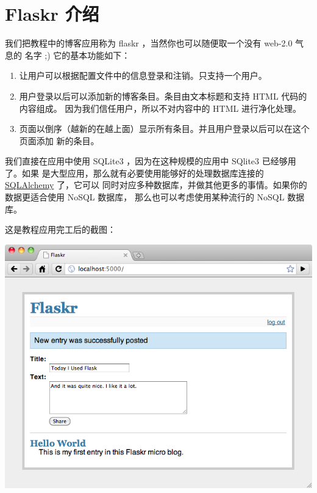 \documentclass[a4paper,12pt]{sphinxmanual}
\begin{document}
\section{Flaskr 介绍}
\label{tutorial/introduction:flaskr}\label{tutorial/introduction::doc}\label{tutorial/introduction:tutorial-introduction}
我们把教程中的博客应用称为 flaskr ，当然你也可以随便取一个没有 web-2.0 气息的
名字  ;)  它的基本功能如下：
\begin{enumerate}
\item {} 
让用户可以根据配置文件中的信息登录和注销。只支持一个用户。

\item {} 
用户登录以后可以添加新的博客条目。条目由文本标题和支持 HTML 代码的内容组成。
因为我们信任用户，所以不对内容中的 HTML 进行净化处理。

\item {} 
页面以倒序（越新的在越上面）显示所有条目。并且用户登录以后可以在这个页面添加
新的条目。

\end{enumerate}

我们直接在应用中使用 SQLite3 ，因为在这种规模的应用中 SQlite3 已经够用了。如果
是大型应用，那么就有必要使用能够好的处理数据库连接的 \href{http://www.sqlalchemy.org/}{SQLAlchemy} 了，它可以
同时对应多种数据库，并做其他更多的事情。如果你的数据更适合使用 NoSQL 数据库，
那么也可以考虑使用某种流行的 NoSQL 数据库。

这是教程应用完工后的截图：

{\hfill\includegraphics{flaskr.png}\hfill}
\end{document}
